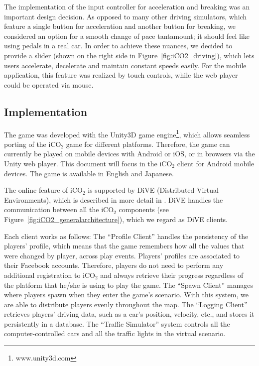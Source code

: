 \documentclass[preprint,authoryear,12pt]{elsarticle}
\begin{document}
The implementation of the input controller for acceleration and breaking was an important design decision. As opposed to many other driving simulators, which feature a single button for acceleration and another button for breaking, we considered an option for a smooth change of pace tantamount; it should feel like using pedals in a real car. In order to achieve these nuances, we decided to provide a slider (shown on the right side in Figure~\ref{fig:iCO2_driving}), which lets users accelerate, decelerate and maintain constant speeds easily. For the mobile application, this feature was realized by touch controls, while the web player could be operated via mouse.

\subsection{Implementation}

The game was developed with the Unity3D game engine\footnote{www.unity3d.com}, which allows seamless porting of the iCO$_2$ game for different platforms. Therefore, the game can currently be played on mobile devices with Android or iOS, or in browsers via the Unity web player. This document will focus in the iCO$_2$ client for Android mobile devices. The game is available in English and Japanese.

The online feature of iCO$_2$ is supported by DiVE (Distributed Virtual Environments), which is described in more detail in \cite{prendingeroliveira2014}. DiVE handles the communication between all the iCO$_2$ components (see Figure~\ref{fig:iCO2_generalarchitecture}), which we regard as DiVE clients.

Each client works as follows: The ``Profile Client'' handles the persistency of the players' profile, which means that the game remembers how all the values that were changed by player, across play events. Players' profiles are associated to their Facebook accounts. Therefore, players do not need to perform any additional registration to iCO$_2$ and always retrieve their progress regardless of the platform that he/she is using to play the game. The ``Spawn Client'' manages where players spawn when they enter the game's scenario. With this system, we are able to distribute players evenly throughout the map. The ``Logging Client'' retrieves players' driving data, such as a car's position, velocity, etc., and stores it persistently in a database. The ``Traffic Simulator'' system controls all the computer-controlled cars and all the traffic lights in the virtual scenario.
\end{document}
